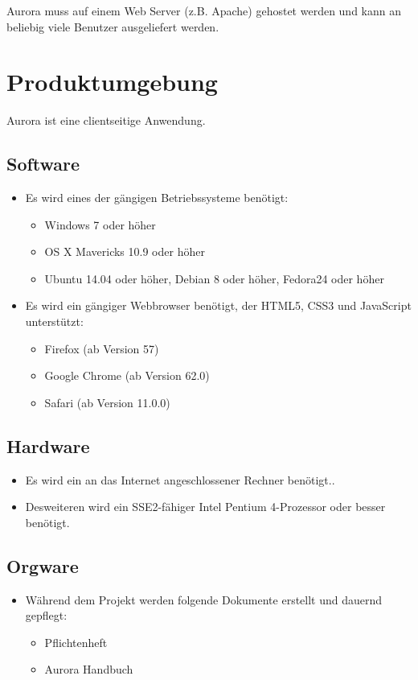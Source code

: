 \documentclass[parskip=full,11pt,twoside]{scrartcl}
\begin{document}
Aurora muss auf einem Web Server (z.B. Apache) gehostet werden und kann an beliebig viele Benutzer ausgeliefert werden.


\newpage
\section{Produktumgebung}
Aurora ist eine clientseitige Anwendung.

\subsection{Software}
	\begin{itemize}
		\item Es wird eines der gängigen Betriebssysteme benötigt:
		\begin{itemize}
			\item Windows 7 oder höher
			\item OS X Mavericks 10.9 oder höher
			\item Ubuntu 14.04 oder höher, Debian 8 oder höher, Fedora24 oder höher
		\end{itemize}
		\item Es wird ein gängiger Webbrowser benötigt, der HTML5, CSS3 und JavaScript unterstützt:
			\begin{itemize}
				\item Firefox (ab Version 57)
				\item Google Chrome (ab Version 62.0)
				\item Safari (ab Version 11.0.0)
			\end{itemize}
	\end{itemize}

\subsection{Hardware}
	\begin{itemize}
		\item Es wird ein an das Internet angeschlossener Rechner benötigt..
		\item Desweiteren wird ein SSE2-fähiger Intel Pentium 4-Prozessor oder besser benötigt.
	\end{itemize}
\subsection{Orgware}
	\begin{itemize}
		\item Während dem Projekt werden folgende Dokumente erstellt und dauernd gepflegt:
			\begin{itemize}
				\item Pflichtenheft
				\item Aurora Handbuch
			\end{itemize}
	\end{itemize}
\newpage
\end{document}
